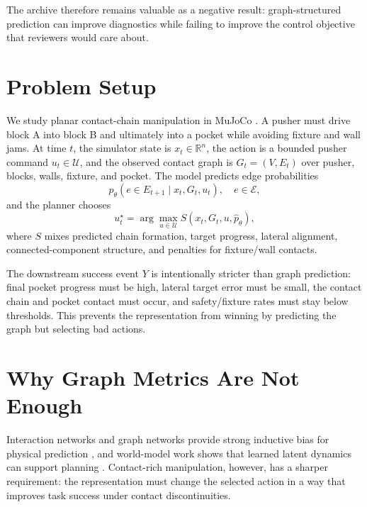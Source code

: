\documentclass{article}
\begin{document}
The archive therefore remains valuable as a negative result: graph-structured prediction can improve diagnostics while failing to improve the control objective that reviewers would care about.

\section{Problem Setup}
We study planar contact-chain manipulation in MuJoCo \citep{todorov2012mujoco}. A pusher must drive block A into block B and ultimately into a pocket while avoiding fixture and wall jams. At time $t$, the simulator state is $x_t \in \mathbb{R}^n$, the action is a bounded pusher command $u_t \in \mathcal{U}$, and the observed contact graph is $G_t=(V,E_t)$ over pusher, blocks, walls, fixture, and pocket. The model predicts edge probabilities
\[
  \hat p_\theta(e \in E_{t+1} \mid x_t,G_t,u_t), \quad e \in \mathcal{E},
\]
and the planner chooses
\[
  u_t^\star = \arg\max_{u\in\mathcal{U}} S(x_t,G_t,u,\hat p_\theta),
\]
where $S$ mixes predicted chain formation, target progress, lateral alignment, connected-component structure, and penalties for fixture/wall contacts.

The downstream success event $Y$ is intentionally stricter than graph prediction: final pocket progress must be high, lateral target error must be small, the contact chain and pocket contact must occur, and safety/fixture rates must stay below thresholds. This prevents the representation from winning by predicting the graph but selecting bad actions.

\section{Why Graph Metrics Are Not Enough}
Interaction networks and graph networks provide strong inductive bias for physical prediction \citep{battaglia2016interaction,battaglia2018relational,sanchezgonzalez2020learning}, and world-model work shows that learned latent dynamics can support planning \citep{ha2018world,hafner2019planet,hafner2020dreamer,ebert2018visual}. Contact-rich manipulation, however, has a sharper requirement: the representation must change the selected action in a way that improves task success under contact discontinuities.
\end{document}
